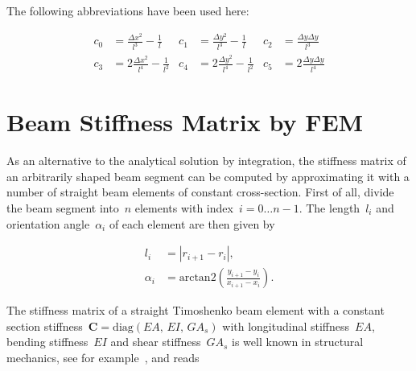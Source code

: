 The following abbreviations have been used here:

\begin{align}
c_0 &= \frac{\Delta x^2}{l^3} - \frac{1}{l} & c_1 &= \frac{\Delta y^2}{l^3} - \frac{1}{l} & c_2 &= \frac{\Delta y\Delta y}{l^3} \\
c_3 &= 2\frac{\Delta x^2}{l^4} - \frac{1}{l^2} & c_4 &= 2\frac{\Delta y^2}{l^4} - \frac{1}{l^2} & c_5 &= 2\frac{\Delta y\Delta y}{l^4}
\end{align}

\newpage
\section{Beam Stiffness Matrix by FEM}
\label{section:beam-stiffness-matrix-alternative}

As an alternative to the analytical solution by integration, the stiffness matrix of an arbitrarily shaped beam segment can be computed by approximating it with a number of straight beam elements of constant cross-section.
First of all, divide the beam segment into~$n$ elements with index~$i = 0 \ldots n-1$.
The length~$l_i$ and orientation angle~$\alpha_i$ of each element are then given by

\begin{align}
l_{i} &= \left| r_{i+1} - r_{i} \right|, \\
\alpha_i &= \mathrm{arctan2}\left(\frac{y_{i+1} - y_{i}}{x_{i+1} - x_{i}}\right).
\end{align}

The stiffness matrix of a straight Timoshenko beam element with a constant section stiffness~$\boldsymbol{C} = \mathrm{diag}(EA,\,EI,\,GA_s)$ with longitudinal stiffness~$EA$, bending stiffness~$EI$ and shear stiffness~$GA_s$ is well known in structural mechanics, see for example~\cite{bib:GFAS}, and reads

